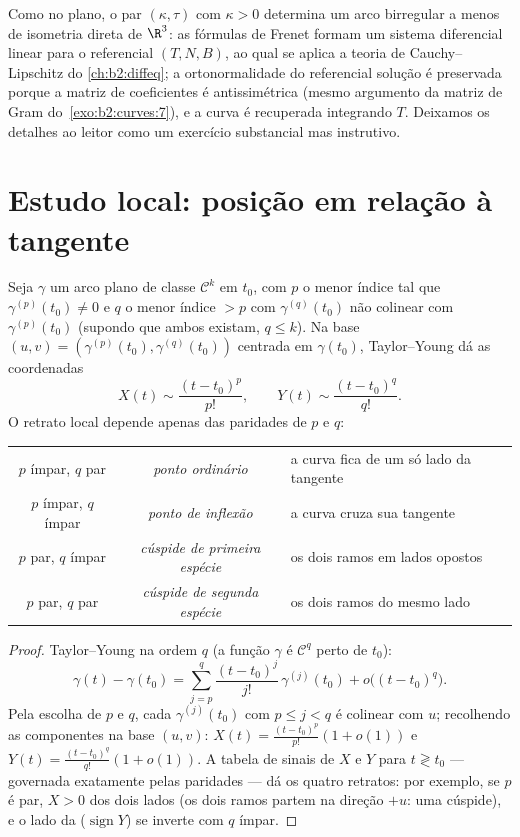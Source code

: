 \begin{remark}
Como no plano, o par $(\kappa, \tau)$ com $\kappa > 0$
determina um arco birregular a menos de isometria direta de $\R^3$: as
fórmulas de Frenet formam um sistema diferencial linear para o referencial
$(T, N, B)$, ao qual se aplica a teoria de Cauchy--Lipschitz do
\cref{ch:b2:diffeq}; a ortonormalidade do referencial solução
é preservada porque a matriz de coeficientes é antissimétrica (mesmo
argumento da matriz de Gram do~\cref{exo:b2:curves:7}), e a curva
é recuperada integrando $T$. Deixamos os detalhes ao
leitor como um exercício substancial mas instrutivo.
\end{remark}

\section{Estudo local: posição em relação à tangente}

\begin{proposition}\label{prop:b2:curves:local}
Seja $\gamma$ um arco plano de classe $\mathcal{C}^k$ em $t_0$, com
$p$ o menor índice tal que $\gamma^{(p)}(t_0) \neq 0$ e $q$ o
menor índice $> p$ com $\gamma^{(q)}(t_0)$ não colinear com
$\gamma^{(p)}(t_0)$ (supondo que ambos existam, $q \leq k$). Na base
$(u, v) = (\gamma^{(p)}(t_0), \gamma^{(q)}(t_0))$ centrada em
$\gamma(t_0)$, Taylor--Young dá as coordenadas
\[
X(t) \sim \frac{(t - t_0)^p}{p!},
\qquad
Y(t) \sim \frac{(t - t_0)^q}{q!} .
\]
O retrato local depende apenas das paridades de $p$ e $q$:
\begin{center}
\begin{tabular}{c c l}
$p$ ímpar, $q$ par & \emph{ponto ordinário} & a curva fica de um só
lado da tangente\\
$p$ ímpar, $q$ ímpar & \emph{ponto de inflexão} & a curva cruza sua
tangente\\
$p$ par, $q$ ímpar & \emph{cúspide de primeira espécie} & os dois ramos
em lados opostos\\
$p$ par, $q$ par & \emph{cúspide de segunda espécie} & os dois
ramos do mesmo lado\\
\end{tabular}
\end{center}
\end{proposition}

\begin{proof}
Taylor--Young na ordem $q$ (a função $\gamma$ é
$\mathcal{C}^q$ perto de $t_0$):
\[
\gamma(t) - \gamma(t_0)
= \sum_{j=p}^{q} \frac{(t-t_0)^j}{j!}\,\gamma^{(j)}(t_0)
+ o\bigl((t-t_0)^q\bigr).
\]
Pela escolha de $p$ e $q$, cada $\gamma^{(j)}(t_0)$ com $p
\leq j < q$ é colinear com $u$; recolhendo as componentes na
base $(u, v)$: $X(t) = \frac{(t-t_0)^p}{p!}(1 + o(1))$ e
$Y(t) = \frac{(t-t_0)^q}{q!}(1 + o(1))$. A tabela de sinais de $X$ e
$Y$ para $t \gtrless t_0$ --- governada exatamente pelas paridades ---
dá os quatro retratos: por exemplo, se $p$ é par, $X > 0$ dos
dois lados (os dois ramos partem na direção $+u$: uma cúspide),
e o lado da  ($\operatorname{sign} Y$) se inverte
com $q$ ímpar.
\end{proof}

